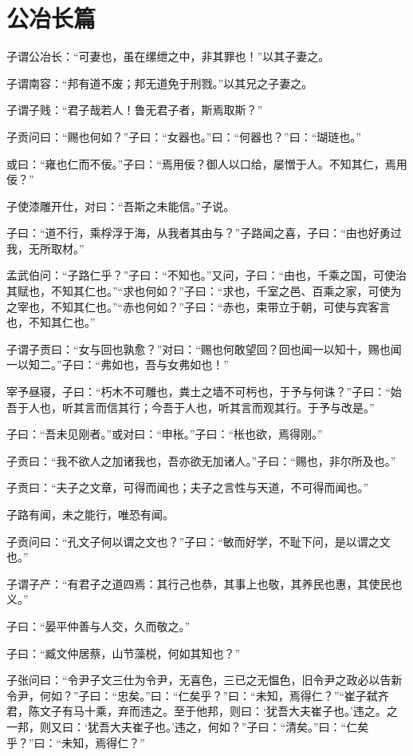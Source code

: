 \documentclass[12pt,a4paper]{ctexbook}
\begin{document}
\section{公冶长篇}
子谓公冶长：“可妻也，虽在缧绁之中，非其罪也！”以其子妻之。\par
子谓南容：“邦有道不废；邦无道免于刑戮。”以其兄之子妻之。\par
子谓子贱：“君子哉若人！鲁无君子者，斯焉取斯？”\par
子贡问曰：“赐也何如？”子曰：“女器也。”曰：“何器也？”曰：“瑚琏也。”\par
或曰：“雍也仁而不佞。”子曰：“焉用佞？御人以口给，屡憎于人。不知其仁，焉用佞？”\par
子使漆雕开仕，对曰：“吾斯之未能信。”子说。\par
子曰：“道不行，乘桴浮于海，从我者其由与？”子路闻之喜，子曰：“由也好勇过我，无所取材。”\par
孟武伯问：“子路仁乎？”子曰：“不知也。”又问，子曰：“由也，千乘之国，可使治其赋也，不知其仁也。”“求也何如？”子曰：“求也，千室之邑、百乘之家，可使为之宰也，不知其仁也。”“赤也何如？”子曰：“赤也，束带立于朝，可使与宾客言也，不知其仁也。”\par
子谓子贡曰：“女与回也孰愈？”对曰：“赐也何敢望回？回也闻一以知十，赐也闻一以知二。”子曰：“弗如也，吾与女弗如也！”\par
宰予昼寝，子曰：“朽木不可雕也，粪土之墙不可杇也，于予与何诛？”子曰：“始吾于人也，听其言而信其行；今吾于人也，听其言而观其行。于予与改是。”\par
子曰：“吾未见刚者。”或对曰：“申枨。”子曰：“枨也欲，焉得刚。”\par
子贡曰：“我不欲人之加诸我也，吾亦欲无加诸人。”子曰：“赐也，非尔所及也。”\par
子贡曰：“夫子之文章，可得而闻也；夫子之言性与天道，不可得而闻也。”\par
子路有闻，未之能行，唯恐有闻。\par
子贡问曰：“孔文子何以谓之文也？”子曰：“敏而好学，不耻下问，是以谓之文也。”\par
子谓子产：“有君子之道四焉：其行己也恭，其事上也敬，其养民也惠，其使民也义。”\par
子曰：“晏平仲善与人交，久而敬之。”\par
子曰：“臧文仲居蔡，山节藻棁，何如其知也？”\par
子张问曰：“令尹子文三仕为令尹，无喜色，三已之无愠色，旧令尹之政必以告新令尹，何如？”子曰：“忠矣。”曰：“仁矣乎？”曰：“未知，焉得仁？”“崔子弑齐君，陈文子有马十乘，弃而违之。至于他邦，则曰：‘犹吾大夫崔子也。’违之。之一邦，则又曰：‘犹吾大夫崔子也。’违之，何如？”子曰：“清矣。”曰：“仁矣乎？”曰：“未知，焉得仁？”\par
\end{document}
